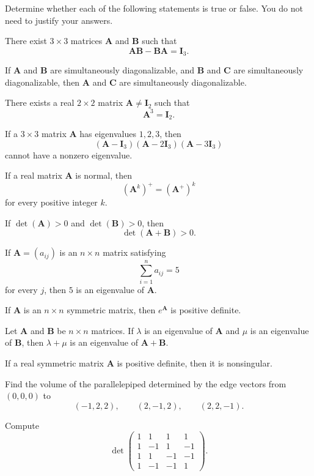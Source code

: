 \documentclass[11pt,oneside]{article}
\begin{document}
\begin{problem}
Determine whether each of the following statements is true or false. You do not need to justify your answers.
\begin{problemchoices}
\item There exist $3\times3$ matrices $\mathbf A$ and $\mathbf B$ such that
\[
\mathbf A\mathbf B-\mathbf B\mathbf A=\mathbf I_3.
\]
\item If $\mathbf A$ and $\mathbf B$ are simultaneously diagonalizable, and $\mathbf B$ and $\mathbf C$ are simultaneously diagonalizable, then $\mathbf A$ and $\mathbf C$ are simultaneously diagonalizable.
\item There exists a real $2\times2$ matrix $\mathbf A\ne\mathbf I_2$ such that
\[
\mathbf A^3=\mathbf I_2.
\]
\item If a $3\times3$ matrix $\mathbf A$ has eigenvalues $1,2,3$, then
\[
(\mathbf A-\mathbf I_3)(\mathbf A-2\mathbf I_3)(\mathbf A-3\mathbf I_3)
\]
cannot have a nonzero eigenvalue.
\item If a real matrix $\mathbf A$ is normal, then
\[
(\mathbf A^k)^+=(\mathbf A^+)^k
\]
for every positive integer $k$.
\item If $\det(\mathbf A)>0$ and $\det(\mathbf B)>0$, then
\[
\det(\mathbf A+\mathbf B)>0.
\]
\item If $\mathbf A=(a_{ij})$ is an $n\times n$ matrix satisfying
\[
\sum_{i=1}^n a_{ij}=5
\]
for every $j$, then $5$ is an eigenvalue of $\mathbf A$.
\item If $\mathbf A$ is an $n\times n$ symmetric matrix, then $e^{\mathbf A}$ is positive definite.
\item Let $\mathbf A$ and $\mathbf B$ be $n\times n$ matrices. If $\lambda$ is an eigenvalue of $\mathbf A$ and $\mu$ is an eigenvalue of $\mathbf B$, then $\lambda+\mu$ is an eigenvalue of $\mathbf A+\mathbf B$.
\item If a real symmetric matrix $\mathbf A$ is positive definite, then it is nonsingular.
\end{problemchoices}
\end{problem}

\begin{problem}
\begin{problemsubparts}
\item Find the volume of the parallelepiped determined by the edge vectors from $(0,0,0)$ to
\[
(-1,2,2),\qquad (2,-1,2),\qquad (2,2,-1).
\]
\item Compute
\[
\det
\begin{pmatrix}
1&1&1&1\\
1&-1&1&-1\\
1&1&-1&-1\\
1&-1&-1&1
\end{pmatrix}.
\]
\end{problemsubparts}
\end{problem}
\end{document}
